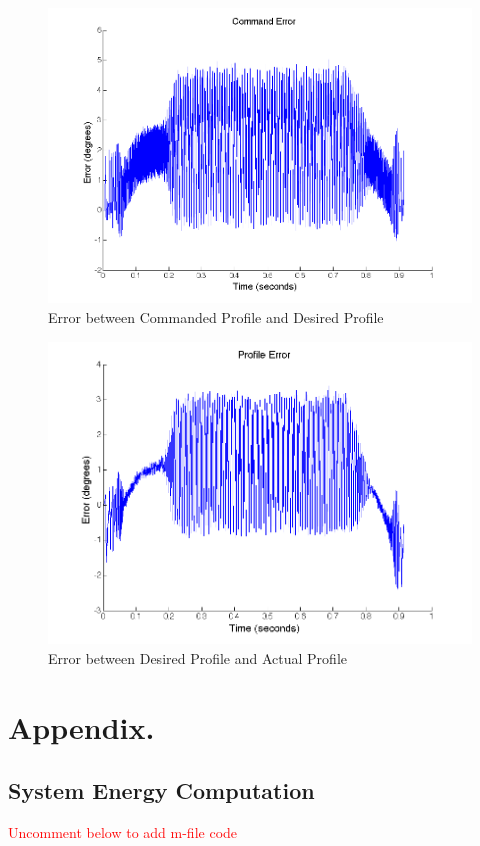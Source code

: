 \documentclass{article}
\newcommand{\xxx}[1]{\textcolor{red}{#1}}
\theoremstyle{plain}
\theoremstyle{definition}
\theoremstyle{remark}
\begin{document}
\begin{figure}[hbt]
\begin{center}
\includegraphics[width = 13cm]{4cCommandError.png}
\caption{Error between Commanded Profile and Desired Profile}
\label{Q4c_CE}
\end{center}
\end{figure}

\begin{figure}[hbt]
\begin{center}
\includegraphics[width = 13cm]{4cProfileError.png}
\caption{Error between Desired Profile and Actual Profile}
\label{Q4c_PE}
\end{center}
\end{figure}

\clearpage




\clearpage
\section*{Appendix.}

\subsection*{System Energy Computation}
\xxx{Uncomment below to add m-file code}
%
\end{document}
